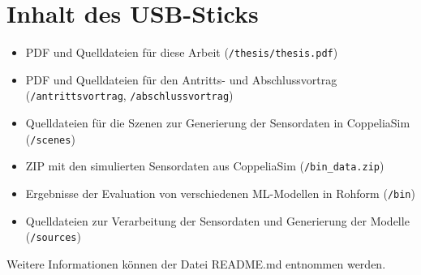 \chapter{Inhalt des USB-Sticks}
\begin{itemize}
    \item PDF und Quelldateien für diese Arbeit (\texttt{/thesis/thesis.pdf})
    \item PDF und Quelldateien für den Antritts- und Abschlussvortrag (\texttt{/antrittsvortrag}, \texttt{/abschlussvortrag})
    \item Quelldateien für die Szenen zur Generierung der Sensordaten in CoppeliaSim (\texttt{/scenes})
    \item ZIP mit den simulierten Sensordaten aus CoppeliaSim (\texttt{/bin\_data.zip})
    \item Ergebnisse der Evaluation von verschiedenen ML-Modellen in Rohform (\texttt{/bin})
    \item Quelldateien zur Verarbeitung der Sensordaten und Generierung der Modelle (\texttt{/sources})
\end{itemize}
Weitere Informationen können der Datei README.md entnommen werden.